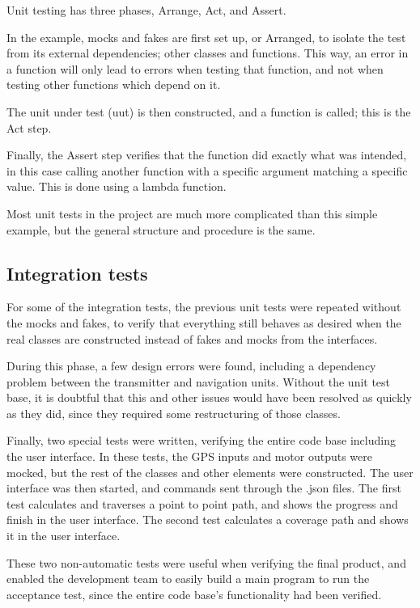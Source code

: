 Unit testing has three phases, Arrange, Act, and Assert. 

In the example, mocks and fakes are first set up, or Arranged, to isolate the test from its external dependencies; other classes and functions. This way, an error in a function will only lead to errors when testing that function, and not when testing other functions which depend on it. 

The unit under test (uut) is then constructed, and a function is called; this is the Act step. 

Finally, the Assert step verifies that the function did exactly what was intended, in this case calling another function with a specific argument matching a specific value. This is done using a lambda function.

Most unit tests in the project are much more complicated than this simple example, but the general structure and procedure is the same. 

\subsection{Integration tests}

For some of the integration tests, the previous unit tests were repeated without the mocks and fakes, to verify that everything still behaves as desired when the real classes are constructed instead of fakes and mocks from the interfaces.

During this phase, a few design errors were found, including a dependency problem between the transmitter and navigation units. Without the unit test base, it is doubtful that this and other issues would have been resolved as quickly as they did, since they required some restructuring of those classes. 

Finally, two special tests were written, verifying the entire code base including the user interface. In these tests, the GPS inputs and motor outputs were mocked, but the rest of the classes and other elements were constructed. The user interface was then started, and commands sent through the .json files. The first test calculates and traverses a point to point path, and shows the progress and finish in the user interface. The second test calculates a coverage path and shows it in the user interface.

These two non-automatic tests were useful when verifying the final product, and enabled the development team to easily build a main program to run the acceptance test, since the entire code base's functionality had been verified.

